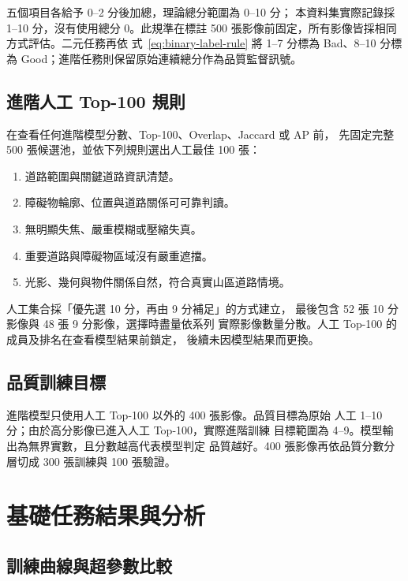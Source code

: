 \documentclass[12pt,a4paper,fontset=none]{ctexart}
\begin{document}
五個項目各給予 0--2 分後加總，理論總分範圍為 0--10 分；
本資料集實際記錄採 1--10 分，沒有使用總分 0。此規準在標註
500 張影像前固定，所有影像皆採相同方式評估。二元任務再依
式~\eqref{eq:binary-label-rule} 將 1--7 分標為 Bad、8--10 分標為
Good；進階任務則保留原始連續總分作為品質監督訊號。

\subsection{進階人工 Top-100 規則}
\label{subsec:human-top100}

在查看任何進階模型分數、Top-100、Overlap、Jaccard 或 AP 前，
先固定完整 500 張候選池，並依下列規則選出人工最佳 100 張：

\begin{enumerate}[label=\arabic*.]
  \item 道路範圍與關鍵道路資訊清楚。
  \item 障礙物輪廓、位置與道路關係可可靠判讀。
  \item 無明顯失焦、嚴重模糊或壓縮失真。
  \item 重要道路與障礙物區域沒有嚴重遮擋。
  \item 光影、幾何與物件關係自然，符合真實山區道路情境。
\end{enumerate}

人工集合採「優先選 10 分，再由 9 分補足」的方式建立，
最後包含 52 張 10 分影像與 48 張 9 分影像，選擇時盡量依系列
實際影像數量分散。人工 Top-100 的成員及排名在查看模型結果前鎖定，
後續未因模型結果而更換。

\subsection{品質訓練目標}
\label{subsec:quality-targets}

進階模型只使用人工 Top-100 以外的 400 張影像。品質目標為原始
人工 1--10 分；由於高分影像已進入人工 Top-100，實際進階訓練
目標範圍為 4--9。模型輸出為無界實數，且分數越高代表模型判定
品質越好。400 張影像再依品質分數分層切成 300 張訓練與
100 張驗證。

\section{基礎任務結果與分析}
\label{sec:binary-results}

\subsection{訓練曲線與超參數比較}
\label{subsec:binary-training}
\end{document}
